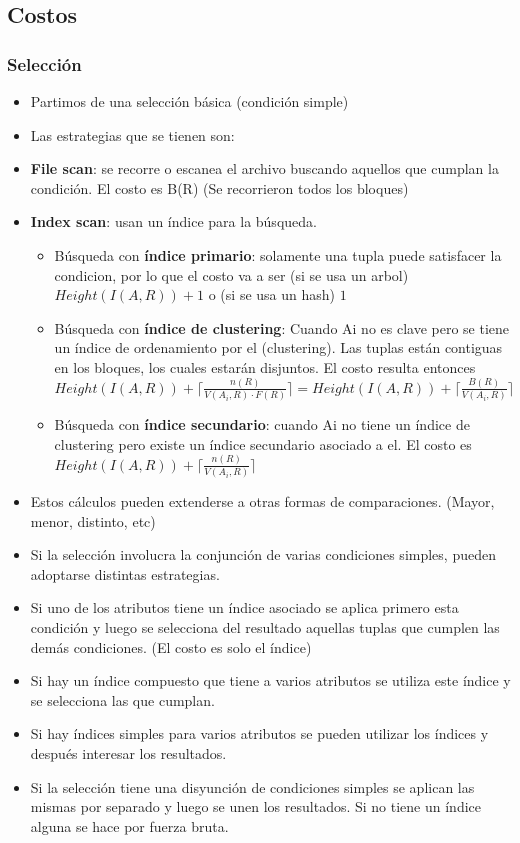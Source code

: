 \subsection*{Costos}
\subsubsection*{Selección}

\begin{itemize}
\item Partimos de una selección básica (condición simple)
\item Las estrategias que se tienen son:
\item \textbf{File scan}: se recorre o escanea el archivo buscando aquellos que cumplan la condición. El costo es B(R) (Se recorrieron todos los bloques)
\item \textbf{Index scan}: usan un índice para la búsqueda.
\begin{itemize}
\item Búsqueda con \textbf{índice primario}: solamente una tupla puede satisfacer la condicion, por lo que el costo va a ser (si se usa un arbol) $Height(I(A,R)) + 1$ o (si se usa un hash) $1$
\item Búsqueda con \textbf{índice de clustering}: Cuando Ai no es clave pero se tiene un índice de ordenamiento por el (clustering). Las tuplas están contiguas en los bloques, los cuales estarán disjuntos. El costo resulta entonces $Height(I(A,R)) + \lceil \frac{n(R)}{V(A_i,R) \cdot F(R)} \rceil = Height(I(A,R)) + \lceil \frac{B(R)}{V(A_i,R)} \rceil $
\item Búsqueda con \textbf{índice secundario}: cuando Ai no tiene un índice de clustering pero existe un índice secundario asociado a el. El costo es $Height(I(A,R)) + \lceil \frac{n(R)}{V(A_i,R)} \rceil $
\end{itemize}
\item Estos cálculos pueden extenderse a otras formas de comparaciones. (Mayor, menor, distinto, etc)
\item Si la selección involucra la conjunción de varias condiciones simples, pueden adoptarse distintas estrategias.
\item Si uno de los atributos tiene un índice asociado se aplica primero esta condición y luego se selecciona del resultado aquellas tuplas que cumplen las demás condiciones. (El costo es solo el índice)
\item Si hay un índice compuesto que tiene a varios atributos se utiliza este índice y se selecciona las que cumplan.
\item Si hay índices simples para varios atributos se pueden utilizar los índices y después interesar los resultados.
\item Si la selección tiene una disyunción de condiciones simples se aplican las mismas por separado y luego se unen los resultados. Si no tiene un índice alguna se hace por fuerza bruta.
\end{itemize}


